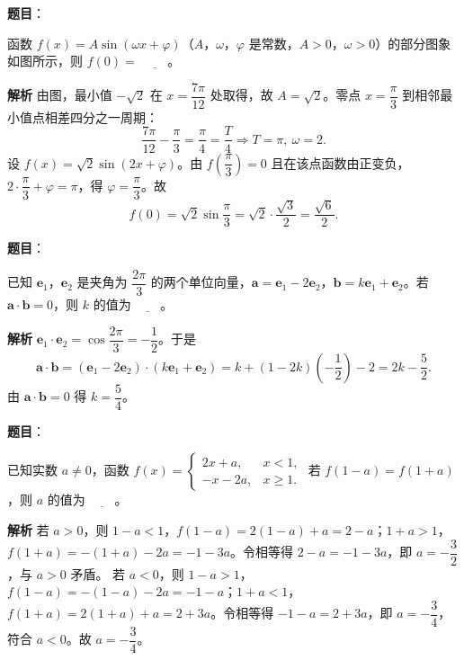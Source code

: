 \begin{answer}

\textbf{题目}：

函数 $f(x)=A\sin(\omega x+\varphi)$（$A$，$\omega$，$\varphi$ 是常数，$A>0$，$\omega>0$）的部分图象如图所示，则 $f(0)=$ $\underline{\qquad}$。
\nopagebreak[4]
\begin{center}\end{center}
\nopagebreak[4]
\textbf{解析}
由图，最小值 $-\sqrt2$ 在 $x=\dfrac{7\pi}{12}$ 处取得，故 $A=\sqrt2$。零点 $x=\dfrac\pi3$ 到相邻最小值点相差四分之一周期：
\nopagebreak[4]
\[\frac{7\pi}{12}-\frac\pi3=\frac{\pi}{4}=\frac{T}{4}\Longrightarrow T=\pi,\ \omega=2.\]
设 $f(x)=\sqrt2\sin(2x+\varphi)$。由 $f\left(\dfrac\pi3\right)=0$ 且在该点函数由正变负，$2\cdot\dfrac\pi3+\varphi=\pi$，得 $\varphi=\dfrac\pi3$。故
\nopagebreak[4]
\[f(0)=\sqrt2\sin\frac\pi3=\sqrt2\cdot\frac{\sqrt3}2=\frac{\sqrt6}2.\]


\end{answer}
\begin{answer}

\textbf{题目}：

已知 $\boldsymbol e_1$，$\boldsymbol e_2$ 是夹角为 $\dfrac{2\pi}3$ 的两个单位向量，$\boldsymbol a=\boldsymbol e_1-2\boldsymbol e_2$，$\boldsymbol b=k\boldsymbol e_1+\boldsymbol e_2$。若 $\boldsymbol a\cdot\boldsymbol b=0$，则 $k$ 的值为 $\underline{\qquad}$。

\textbf{解析}
$\boldsymbol e_1\cdot\boldsymbol e_2=\cos\dfrac{2\pi}3=-\dfrac12$。于是
\nopagebreak[4]
\[\boldsymbol a\cdot\boldsymbol b=(\boldsymbol e_1-2\boldsymbol e_2)\cdot(k\boldsymbol e_1+\boldsymbol e_2)
=k+(1-2k)\left(-\frac12\right)-2=2k-\frac52.\]
由 $\boldsymbol a\cdot\boldsymbol b=0$ 得 $k=\dfrac54$。


\end{answer}
\begin{answer}

\textbf{题目}：

已知实数 $a\neq0$，函数 $f(x)=\begin{cases}2x+a,&x<1,\\-x-2a,&x\geqslant1.\end{cases}$ 若 $f(1-a)=f(1+a)$，则 $a$ 的值为 $\underline{\qquad}$。

\textbf{解析}
若 $a>0$，则 $1-a<1$，$f(1-a)=2(1-a)+a=2-a$；$1+a>1$，$f(1+a)=-(1+a)-2a=-1-3a$。令相等得 $2-a=-1-3a$，即 $a=-\dfrac32$，与 $a>0$ 矛盾。
若 $a<0$，则 $1-a>1$，$f(1-a)=-(1-a)-2a=-1-a$；$1+a<1$，$f(1+a)=2(1+a)+a=2+3a$。令相等得 $-1-a=2+3a$，即 $a=-\dfrac34$，符合 $a<0$。故 $a=-\dfrac34$。


\end{answer}
